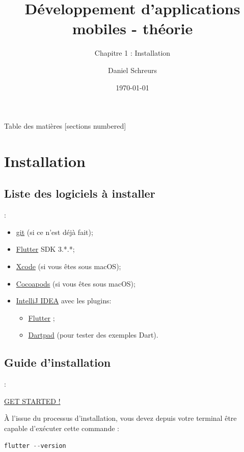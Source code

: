 \documentclass[10pt]{beamer}
\title{Développement d'applications mobiles - théorie}
\subtitle{Chapitre 1 : Installation}
\date{\today}
\author{Daniel Schreurs}
\institute{Haute École de la Province de Liège}
\begin{document}
\maketitle

\begin{frame}[allowframebreaks]{Table des matières}
    [sections numbered]
    \tableofcontents
\end{frame}

\section{Installation}

\subsection{Liste des logiciels à installer}
\begin{frame}[fragile,t]{\secname : \subsecname}
    \begin{itemize}
        \item \href{https://git-scm.com/downloads}{git} (si ce n'est déjà fait);
        \item \href{https://flutter.dev/docs/get-started/install}{Flutter} SDK 3.*.*;
        \item \href{https://itunes.apple.com/us/app/xcode/id497799835}{Xcode} (si vous êtes sous macOS);
        \item \href{https://guides.cocoapods.org/using/getting-started.html#installation}{Cocoapods} (si vous êtes sous macOS);
        \item \href{https://www.jetbrains.com/fr-fr/idea/download/#section=mac}{IntelliJ IDEA} avec les plugins:
              \begin{itemize}
                  \item \href{https://plugins.jetbrains.com/plugin/9212-flutter}{Flutter} ;
                  \item \href{https://plugins.jetbrains.com/plugin/16602-embedded-dartpad}{Dartpad} (pour tester des exemples Dart).
              \end{itemize}
    \end{itemize}
\end{frame}

\subsection{Guide d'installation}
\begin{frame}[fragile,t]{\secname : \subsecname}
    \begin{center}
        \href{https://flutter.dev/docs/get-started/install}{GET STARTED !}
    \end{center}
    À l'issue du processus d'installation, vous devez depuis votre terminal être capable d’exécuter cette commande :
    \begin{lstlisting}[caption={Connaître la version de flutter},language=C, label=getversion]
    flutter --version
    \end{lstlisting}
\end{frame}
\end{document}
